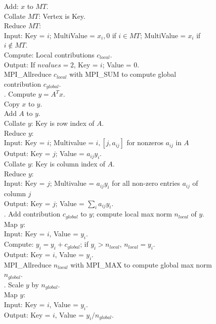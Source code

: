 \begin{figure}[htb]
\begin{center}
{\begin{minipage}{\textwidth}
\begin{tabbing}
\> \> Add: $x$ to $MT$. \\
\> \> Collate $MT$:  Vertex is Key. \\
\> \> Reduce $MT$:   \\
\> \> \> Input:  Key = $i$; MultiValue = $x_i, 0$ if $i \in {MT}$; MultiValue = $x_i$ if $i \notin {MT}$. \\
\> \> \> Compute:  Local contributions $c_{local}$. \\
\> \> \> Output:  If ${nvalues} = 2$, Key = $i$; Value = 0. \\
\> \> MPI\_Allreduce $c_{local}$ with MPI\_SUM to compute global contribution $c_{global}$. \\
. Compute $y = A^T x$.  \\
\> \> Copy $x$ to $y$. \\
\> \> Add $A$ to $y$. \\
\> \> Collate $y$:  Key is row index of $A$. \\
\> \> Reduce $y$: \\
\> \> \>  Input: Key = $i$; Multivalue = $i, [j, a_{ij}]$ for nonzeros $a_{ij}$ in $A$ \\
\> \> \>  Output:  Key = $j$; Value = $a_{ij} y_i$. \\
\> \> Collate $y$:  Key is column index of $A$. \\
\> \> Reduce $y$:  \\
\> \> \> Input:  Key = $j$; Multivalue = $a_{ij} y_i$ for all non-zero entries $a_{ij}$ of column $j$ \\
\> \> \> Output:  Key = $j$; Value = $\sum_i a_{ij} y_i$. \\
. Add contribution $c_{global}$ to $y$; compute local max norm $n_{local}$ of $y$. \\
\> \> Map $y$:  \\
\> \> \> Input:  Key = $i$, Value = $y_i$. \\
\> \> \> Compute: $y_i = y_i + c_{global}$; if $y_i > n_{local}$, $n_{local} = y_i$. \\
\> \> \> Output:  Key = $i$, Value = $y_i$. \\
\> \> MPI\_Allreduce $n_{local}$ with MPI\_MAX to compute global max norm $n_{global}$. \\
. Scale $y$ by $n_{global}$. \\
\> \> Map $y$: \\
\> \> \> Input:  Key = $i$, Value = $y_i$. \\
\> \> \> Output:  Key = $i$, Value = $y_i / {n_{global}}$. \\

\end{tabbing}
\end{minipage}}
\end{center}
\end{figure}

